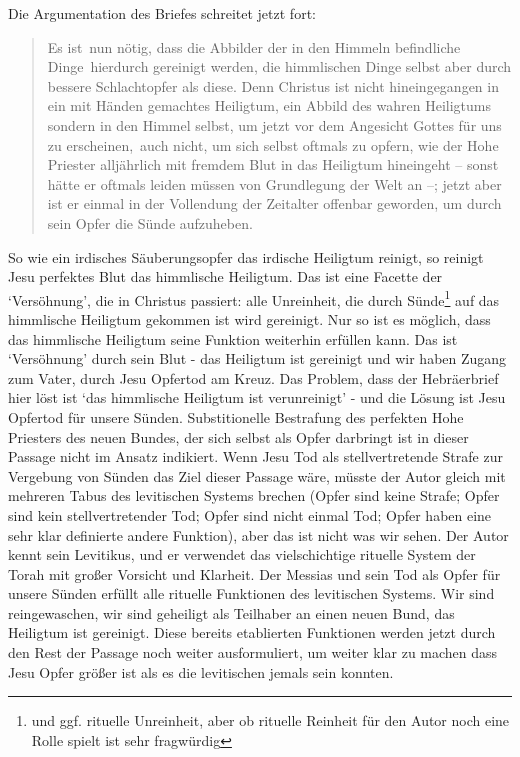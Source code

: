 Die Argumentation des Briefes schreitet jetzt fort:
\begin{quote}
\textlangle Es ist\textrangle\ nun nötig, dass die Abbilder der in den Himmeln \textlangle befindliche Dinge\textrangle\ hierdurch gereinigt werden, die himmlischen Dinge selbst aber durch bessere Schlachtopfer als diese.
Denn Christus ist nicht hineingegangen in ein mit Händen gemachtes Heiligtum, ein Abbild des wahren \textlangle Heiligtums\textrangle\, sondern in den Himmel selbst,
um jetzt vor dem Angesicht Gottes für uns zu erscheinen, auch nicht, um sich selbst oftmals zu opfern, wie der Hohe Priester alljährlich mit fremdem Blut in das Heiligtum hineingeht
– sonst hätte er oftmals leiden müssen von Grundlegung der Welt an –; jetzt aber ist er einmal in der Vollendung der Zeitalter offenbar geworden, um durch sein Opfer die Sünde aufzuheben.
\end{quote}
So wie ein irdisches Säuberungsopfer das irdische Heiligtum reinigt, so reinigt Jesu perfektes Blut das himmlische Heiligtum.
Das ist eine Facette der `Versöhnung', die in Christus passiert: alle Unreinheit, die durch Sünde\footnote{und ggf. rituelle Unreinheit, aber ob rituelle Reinheit für den Autor noch eine Rolle spielt ist sehr fragwürdig} auf das himmlische Heiligtum gekommen ist wird gereinigt.
Nur so ist es möglich, dass das himmlische Heiligtum seine Funktion weiterhin erfüllen kann.
Das ist `Versöhnung' durch sein Blut - das Heiligtum ist gereinigt und wir haben Zugang zum Vater, durch Jesu Opfertod am Kreuz.
Das Problem, dass der Hebräerbrief hier löst ist `das himmlische Heiligtum ist verunreinigt' - und die Lösung ist Jesu Opfertod für unsere Sünden.
Substitionelle Bestrafung des perfekten Hohe Priesters des neuen Bundes, der sich selbst als Opfer darbringt ist in dieser Passage nicht im Ansatz indikiert.
Wenn Jesu Tod als stellvertretende Strafe zur Vergebung von Sünden das Ziel dieser Passage wäre, müsste der Autor gleich mit mehreren Tabus des levitischen Systems brechen (Opfer sind keine Strafe; Opfer sind kein stellvertretender Tod; Opfer sind nicht einmal Tod; Opfer haben eine sehr klar definierte andere Funktion), aber das ist nicht was wir sehen.
Der Autor kennt sein Levitikus, und er verwendet das vielschichtige rituelle System der Torah mit großer Vorsicht und Klarheit.
Der Messias und sein Tod als Opfer für unsere Sünden erfüllt alle rituelle Funktionen des levitischen Systems.
Wir sind reingewaschen, wir sind geheiligt als Teilhaber an einen neuen Bund, das Heiligtum ist gereinigt.
Diese bereits etablierten Funktionen werden jetzt durch den Rest der Passage noch weiter ausformuliert, um weiter klar zu machen dass Jesu Opfer größer ist als es die levitischen jemals sein konnten.

